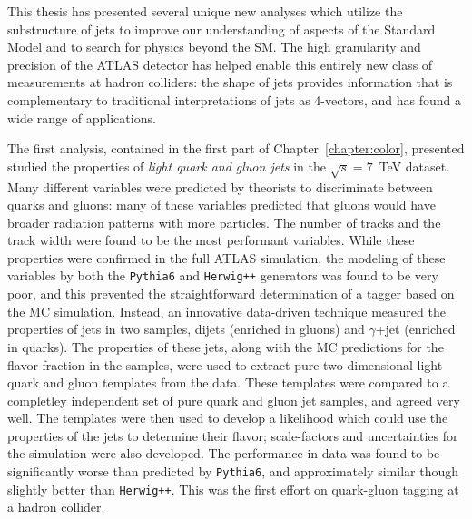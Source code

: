 \label{chapter:conclusion}

This thesis has presented several unique new analyses which utilize the substructure of jets to improve our understanding of aspects of the Standard Model and to search for physics beyond the SM. The high granularity and precision of the ATLAS detector has helped enable this entirely new class of measurements at hadron colliders: the shape of jets provides information that is complementary to traditional interpretations of jets as 4-vectors, and has found a wide range of applications.

The first analysis, contained in the first part of Chapter~\ref{chapter:color}, presented studied the properties of \textit{light quark and gluon jets} in the $\sqrt{s} = 7$~TeV dataset. Many different variables were predicted by theorists to discriminate between quarks and gluons: many of these variables predicted that gluons would have broader radiation patterns with more particles. The number of tracks and the track width were found to be the most performant variables. While these properties were confirmed in the full ATLAS simulation, the modeling of these variables by both the \texttt{Pythia6} and \texttt{Herwig++} generators was found to be very poor, and this prevented the straightforward determination of a tagger based on the MC simulation. Instead, an innovative data-driven technique measured the properties of jets in two samples, dijets (enriched in gluons) and $\gamma$+jet (enriched in quarks). The properties of these jets, along with the MC predictions for the flavor fraction in the samples, were used to extract pure two-dimensional light quark and gluon templates from the data. These templates were compared to a completley independent set of pure quark and gluon jet samples, and agreed very well. The templates were then used to develop a likelihood which could use the properties of the jets to determine their flavor; scale-factors and uncertainties for the simulation were also developed. The performance in data was found to be significantly worse than predicted by \texttt{Pythia6}, and approximately similar though slightly better than \texttt{Herwig++}.  This was the first effort on quark-gluon tagging at a hadron collider.

